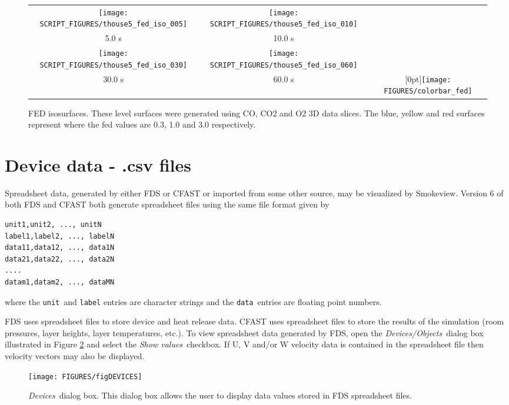 \documentclass[11pt,twoside]{book}
\begin{document}
\begin{figure}[\figoptions]
\begin{center}
\begin{tabular}{ccc}
\texttt{[image: SCRIPT\_FIGURES/thouse5\_fed\_iso\_005]}&
\texttt{[image: SCRIPT\_FIGURES/thouse5\_fed\_iso\_010]}\\
5.0 s&10.0 s\\
\texttt{[image: SCRIPT\_FIGURES/thouse5\_fed\_iso\_030]}&
\texttt{[image: SCRIPT\_FIGURES/thouse5\_fed\_iso\_060]}&\\
30.0 s&60.0 s
&\raisebox{0.0ex}[0pt]{\texttt{[image: FIGURES/colorbar\_fed]}}\\
\end{tabular}
\caption [FED slices.]
{FED isosurfaces.
These level surfaces were generated using CO, CO2 and O2 3D data slices.
The blue, yellow and red surfaces represent where the fed values are 0.3, 1.0 and 3.0 respectively.
}
\label{figfediso}%
\end{center}
\end{figure}

\section{Device data - .csv files}
Spreadsheet data, generated by either FDS or CFAST or imported from some other source, may be visualized by Smokeview.
Version 6 of both FDS and CFAST
both generate spreadsheet files using the same file format given by
\begin{lstlisting}
unit1,unit2, ..., unitN
label1,label2, ..., labelN
data11,data12, ..., data1N
data21,data22, ..., data2N
....
datam1,datam2, ..., dataMN
\end{lstlisting}
where the {\tt unit}\ and {\tt label} entries are character strings and the {\tt data}\ entries are floating point numbers.

FDS uses spreadsheet files to store device and heat release data.
CFAST uses spreadsheet files to store the results of the
simulation (room pressures, layer heights, layer temperatures,
etc.). To view spreadsheet data generated by FDS, open the {\em
Devices/Objects}\ dialog box illustrated in Figure
\ref{figDEVICES} and select the {\em Show values}\ checkbox. If U,
V and/or W velocity data is contained in the spreadsheet file then
velocity vectors may also be displayed.

\begin{figure}[\figoptions]
\begin{center}
\texttt{[image: FIGURES/figDEVICES]}
\end{center}
\caption[{\em Devices}\ dialog box.]{{\em Devices}\ dialog box.
This dialog box allows the user to display data values stored in
FDS spreadsheet files.} \label{figDEVICES}
\end{figure}
\end{document}
